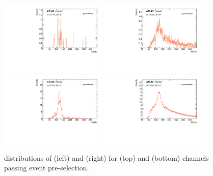 \begin{figure}[htbp]
  \centering
 \includegraphics[width=0.45\textwidth]{figures/VBF/Mbb_VH_2cen.pdf}
 \includegraphics[width=0.45\textwidth]{figures/VBF/Mbb_ttH_2cen.pdf}\\
 \includegraphics[width=0.45\textwidth]{figures/VBF/Mbb_VH_4cen.pdf}
 \includegraphics[width=0.45\textwidth]{figures/VBF/Mbb_ttH_4cen.pdf}
 \caption{\Mbb distributions of \VH (left) and \ttH (right) for \twocentral (top) and \fourcentral (bottom) channels passing event pre-selection. }
  \label{fig:Mbb-ttH-VH}
\end{figure}

